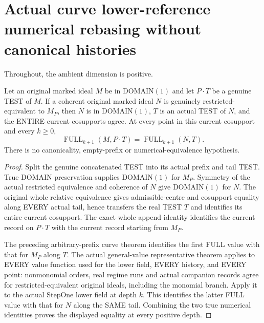 \section{Actual curve lower-reference numerical rebasing without canonical histories}

Throughout, the ambient dimension is positive.

\begin{theorem}
\label{hir:original-curve-full-relative-reference-rebase}
\leanok
Let an original marked ideal $M$ be in DOMAIN$(1)$ and let
$P\mathbin{\cdot}T$ be a genuine TEST of $M$. If a coherent original
marked ideal $N$ is genuinely restricted-equivalent to $M_P$, then $N$
is in DOMAIN$(1)$, $T$ is an actual TEST of $N$, and the ENTIRE current
cosupports agree. At every point in this current cosupport and every
$k\ge0$,
\[
 \operatorname{FULL}_{k+1}(M,P\mathbin{\cdot}T)
 =\operatorname{FULL}_{k+1}(N,T).
\]
There is no canonicality, empty-prefix or numerical-equivalence hypothesis.
\end{theorem}
\begin{proof}
Split the genuine concatenated TEST into its actual prefix and tail TEST.
True DOMAIN preservation supplies DOMAIN$(1)$ for $M_P$. Symmetry of the
actual restricted equivalence and coherence of $N$ give DOMAIN$(1)$ for
$N$. The original whole relative equivalence gives admissible-centre
and cosupport equality along EVERY actual tail, hence transfers the real
TEST $T$ and identifies its entire current cosupport. The exact whole
append identity identifies the current record on $P\mathbin{\cdot}T$
with the current record starting from $M_P$.

The preceding arbitrary-prefix curve theorem identifies the first FULL
value with that for $M_P$ along $T$. The actual general-value
representative theorem applies to EVERY value function used for the
lower field, EVERY history, and EVERY point: nonmonomial orders, real
regime runs and actual companion records agree for restricted-equivalent
original ideals, including the monomial branch. Apply it to the actual
StepOne lower field at depth $k$. This identifies the latter FULL value
with that for $N$ along the SAME tail. Combining the two true numerical
identities proves the displayed equality at every positive depth.
\end{proof}

